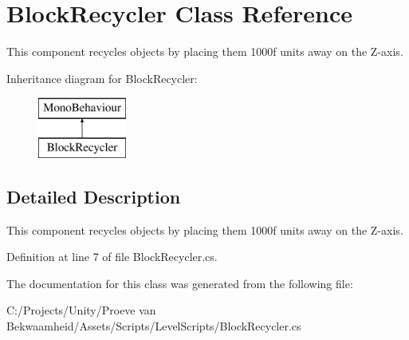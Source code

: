 \hypertarget{class_block_recycler}{\section{Block\+Recycler Class Reference}
\label{class_block_recycler}
}


This component recycles objects by placing them 1000f units away on the Z-\/axis.  


Inheritance diagram for Block\+Recycler\+:\begin{figure}[H]
\begin{center}
\leavevmode
\includegraphics[height=2.000000cm]{class_block_recycler}
\end{center}
\end{figure}


\subsection{Detailed Description}
This component recycles objects by placing them 1000f units away on the Z-\/axis. 



Definition at line 7 of file Block\+Recycler.\+cs.



The documentation for this class was generated from the following file\+:\begin{DoxyCompactItemize}
\item 
C\+:/\+Projects/\+Unity/\+Proeve van Bekwaamheid/\+Assets/\+Scripts/\+Level\+Scripts/Block\+Recycler.\+cs\end{DoxyCompactItemize}
